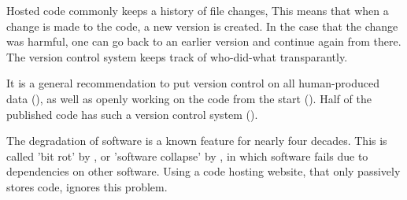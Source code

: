 
Hosted code commonly keeps a history of file changes,
This means that when a change is made to the code,
a new version is created. In the case that the change was harmful,
one can go back to an earlier version and continue again from there.
The version control system keeps track of who-did-what transparantly.

It is a general recommendation to put version control
on all human-produced data (\cite{wilson2014best}),
as well as openly working on the code from the start (\cite{jimenez2017four}).
Half of the published code has such a version control 
system (\cite{stodden2018empirical}).

The degradation of software is a known feature for nearly 
four decades.
This is called 'bit rot' by \cite{steele1983hacker},
or 'software collapse' by \cite{hinsen2019dealing},
in which software fails due to dependencies on other 
software.
Using a code hosting website, 
that only passively stores code,
ignores this problem.

